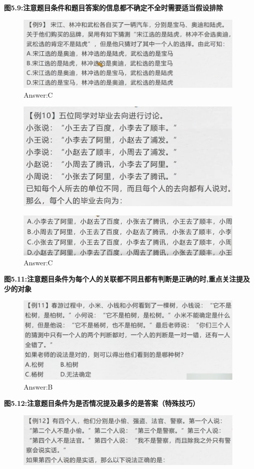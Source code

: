 \documentclass{article}
\numberwithin{equation}{section}						%
\numberwithin{figure}{section}							%
\begin{document}
\begin{sloppypar}
\textbf{图5.9:注意题目条件和题目答案的信息都不确定不全时需要适当假设排除}

\begin{figure}[H]
     \centering
     \includegraphics[width=0.6\linewidth]{202.png}
		\caption{Answer:C}
\end{figure}


\begin{figure}[H]
     \centering
     \includegraphics[width=0.5\linewidth]{203.png}
\end{figure}

\begin{figure}[H]
     \centering
     \includegraphics[width=0.5\linewidth]{204.png}
		\caption{Answer:C}
\end{figure}

\textbf{图5.11:注意题目条件为每个人的关联都不同且都有判断是正确的时,重点关注提及少的对象}

\begin{figure}[H]
     \centering
     \includegraphics[width=0.6\linewidth]{205.png}
		\caption{Answer:B}
\end{figure}

\textbf{图5.12:注意题目条件为是否情况提及最多的是答案（特殊技巧）}


\begin{figure}[H]
     \centering
     \includegraphics[width=0.6\linewidth]{206.png}
\end{figure}


\end{sloppypar}
\end{document}
